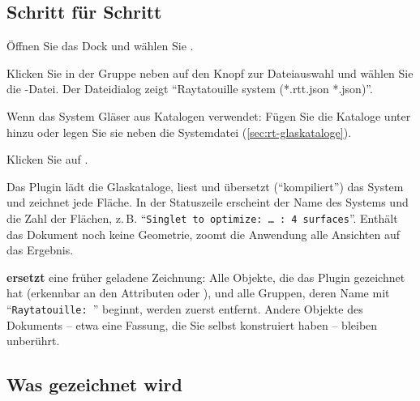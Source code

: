 \subsection{Schritt für Schritt}

\begin{schritte}
  \item Öffnen Sie das Dock  und wählen Sie .
  \item Klicken Sie in der Gruppe  neben  auf den Knopf zur
    Dateiauswahl und wählen Sie die -Datei. Der Dateidialog zeigt
    \enquote{Raytatouille system (*.rtt.json *.json)}.
  \item Wenn das System Gläser aus Katalogen verwendet: Fügen Sie die Kataloge unter
     hinzu oder legen Sie sie neben die Systemdatei
    (\autoref{sec:rt-glaskataloge}).
  \item Klicken Sie auf .
\end{schritte}

Das Plugin lädt die Glaskataloge, liest und übersetzt (\enquote{kompiliert}) das System und
zeichnet jede Fläche. In der Statuszeile erscheint der Name des Systems und die Zahl der Flächen,
z.\,B. \enquote{\texttt{Singlet to optimize: … : 4 surfaces}}. Enthält das Dokument noch keine
Geometrie, zoomt die Anwendung alle Ansichten auf das Ergebnis.

 \textbf{ersetzt} eine früher geladene Zeichnung: Alle Objekte, die das Plugin
gezeichnet hat (erkennbar an den Attributen  oder ), und alle
Gruppen, deren Name mit \enquote{\texttt{Raytatouille: }} beginnt, werden zuerst entfernt.
Andere Objekte des Dokuments -- etwa eine Fassung, die Sie selbst konstruiert haben -- bleiben
unberührt.

\subsection{Was gezeichnet wird}

